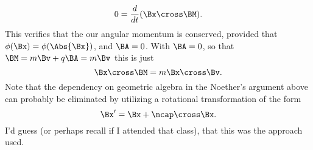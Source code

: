 {%
\begin{dmath}\label{eqn:classicalMechanicsPs2:930}
0 = \frac{d}{dt} (\Bx \cross \BM).
\end{dmath}
%
This verifies that the our angular momentum is conserved, provided that \(\phi(\Bx) = \phi(\Abs{\Bx})\), and \(\BA = 0\).  With \(\BA = 0\), so that \(\BM = m \Bv + q \BA = m \Bv\) this is just
%
\begin{dmath}\label{eqn:classicalMechanicsPs2:870}
\Bx \cross \BM = m \Bx \cross \Bv.
\end{dmath}
%
Note that the dependency on geometric algebra in the Noether's argument above can probably be eliminated by utilizing a rotational transformation of the form
%
\begin{dmath}\label{eqn:classicalMechanicsPs2:871}
\Bx' = \Bx + \ncap \cross \Bx.
\end{dmath}
%
I'd guess (or perhaps recall if I attended that class), that this was the approach used.
%
%
%
%
}
%
